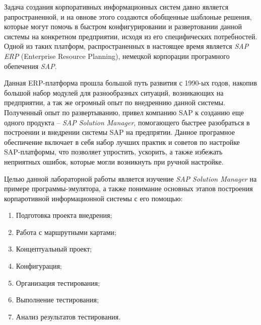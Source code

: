 \Introduction

Задача создания корпоративных информационных систем давно является рапространенной,
и на овнове этого создаются обобщенные шаблоные решения, которые могут помочь
в быстром конфигурировании и развертовании данной системы на конкретном предприятии,
исходя из его специфических потребностей. Одной из таких платформ,
распространенных в настоящее время является \textit{SAP ERP} (Enterprise Resource Planning),
немецкой корпорации програмного обепечения \textit{SAP}.

Данная ERP-платформа прошла большой путь развития с 1990-ых годов, накопив большой
набор модулей для разнообразных ситуаций, возникающих на предприятии, а так же
огромный опыт по внедреннию данной системы. Полученный опыт по развертыванию,
привел компанию SAP к созданию еще одного продукта -- \textit{SAP Solution Manager},
помогающего быстрее разобраться в построении и внедрении системы SAP на предпрятии.
Данное програмное обеспичение включает в себя набор лучших практик и советов
по настройке SAP-платформы, что позволяет упростить, ускорить, а также избежать
неприятных ошибок, которые могли возникнуть при ручной настройке.

Целью данной лабораторной работы является изучение \textit{SAP Solution Manager}
на примере программы-эмулятора, а также понимание основных этапов построения
корпаротивной информационной системы с его помощью:

\begin{enumerate}
\item Подготовка проекта внедрения;
\item Работа с маршрутными картами;
\item Концептуальный проект;
\item Конфигурация;
\item Организация тестирования;
\item Выполнение тестирования;
\item Анализ результатов тестирования.
\end{enumerate}

